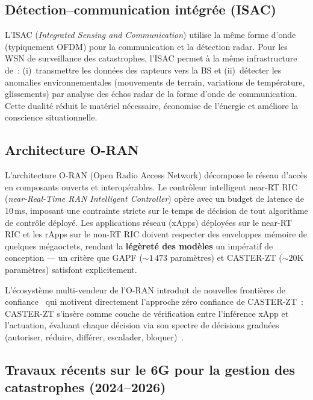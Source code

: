 \subsection{Détection--communication intégrée (ISAC)}

L'ISAC (\emph{Integrated Sensing and Communication}) utilise la même forme d'onde (typiquement OFDM) pour la communication et la détection radar. Pour les WSN de surveillance des catastrophes, l'ISAC permet à la même infrastructure de~: (i)~transmettre les données des capteurs vers la BS et (ii)~détecter les anomalies environnementales (mouvements de terrain, variations de température, glissements) par analyse des échos radar de la forme d'onde de communication. Cette dualité réduit le matériel nécessaire, économise de l'énergie et améliore la conscience situationnelle.

\subsection{Architecture O-RAN}

L'architecture O-RAN (Open Radio Access Network) décompose le réseau d'accès en composants ouverts et interopérables. Le contrôleur intelligent near-RT RIC (\emph{near-Real-Time RAN Intelligent Controller}) opère avec un budget de latence de 10\,ms, imposant une contrainte stricte sur le temps de décision de tout algorithme de contrôle déployé. Les applications réseau (xApps) déployées sur le near-RT RIC et les rApps sur le non-RT RIC doivent respecter des enveloppes mémoire de quelques mégaoctets, rendant la \textbf{légèreté des modèles} un impératif de conception --- un critère que GAPF (${\sim}1\,473$ paramètres) et CASTER-ZT (${\sim}20$K paramètres) satisfont explicitement.

L'écosystème multi-vendeur de l'O-RAN introduit de nouvelles frontières de confiance~\cite{rose2020nist} qui motivent directement l'approche zéro confiance de CASTER-ZT~: CASTER-ZT s'insère comme couche de vérification entre l'inférence xApp et l'actuation, évaluant chaque décision via son spectre de décisions graduées (autoriser, réduire, différer, escalader, bloquer)~\cite{alshiekh2018shielding}.

\subsection{Travaux récents sur le 6G pour la gestion des catastrophes (2024--2026)}

